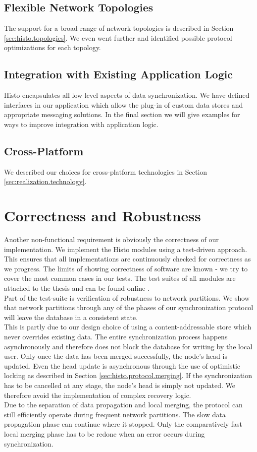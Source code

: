 \subsection*{Flexible Network Topologies}
The support for a broad range of network topologies is described in Section \ref{sec:histo.topologies}.
We even went further and identified possible protocol optimizations for each topology.

\subsection*{Integration with Existing Application Logic}
Histo encapsulates all low-level aspects of data synchronization.
We have defined interfaces in our application which allow the plug-in of custom data stores and appropriate messaging solutions.
In the final section we will give examples for ways to improve integration with application logic.

\subsection*{Cross-Platform}
We described our choices for cross-platform technologies in Section \ref{sec:realization.technology}.

\section{Correctness and Robustness}
Another non-functional requirement is obviously the correctness of our implementation.
We implement the Histo modules using a test-driven approach.
This ensures that all implementations are continuously checked for correctness as we progress.
The limits of showing correctness of software are known - we try to cover the most common cases in our tests.
The test suites of all modules are attached to the thesis and can be found online \cite{histo-source}.
\\

Part of the test-suite is verification of robustness to network partitions.
We show that network partitions through any of the phases of our synchronization protocol will leave the database in a consistent state.\\
This is partly due to our design choice of using a content-addressable store which never overrides existing data.
The entire synchronization process happens asynchronously and therefore does not block the database for writing by the local user.
Only once the data has been merged successfully, the node's head is updated.
Even the head update is asynchronous through the use of optimistic locking as described in Section \ref{sec:histo.protocol.merging}.
If the synchronization has to be cancelled at any stage, the node's head is simply not updated.
We therefore avoid the implementation of complex recovery logic.\\
Due to the separation of data propagation and local merging, the protocol can still efficiently operate during frequent network partitions.
The slow data propagation phase can continue where it stopped.
Only the comparatively fast local merging phase has to be redone when an error occurs during synchronization.


